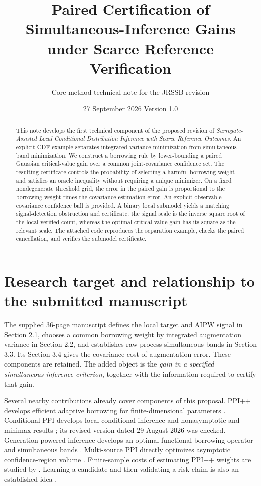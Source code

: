 \documentclass[11pt]{article}
\title{Paired Certification of Simultaneous-Inference Gains\\under Scarce Reference Verification}
\author{Core-method technical note for the JRSSB revision}
\date{27 September 2026 \quad Version 1.0}
\theoremstyle{remark}\newtheorem{remark}[theorem]{Remark}
\begin{document}
\maketitle
\begin{abstract}
This note develops the first technical component of the proposed revision of
\emph{Surrogate-Assisted Local Conditional Distribution Inference with Scarce Reference Outcomes}.
An explicit CDF example separates integrated-variance minimization from simultaneous-band minimization.
We construct a borrowing rule by lower-bounding a paired Gaussian critical-value gain over a common joint-covariance confidence set.
The resulting certificate controls the probability of selecting a harmful borrowing weight and satisfies an oracle inequality without requiring a unique minimizer.
On a fixed nondegenerate threshold grid, the error in the paired gain is proportional to the borrowing weight times the covariance-estimation error.
An explicit observable covariance confidence ball is provided.
A binary local submodel yields a matching signal-detection obstruction and certificate: the signal scale is the inverse square root of the local verified count, whereas the optimal critical-value gain has its square as the relevant scale.
The attached code reproduces the separation example, checks the paired cancellation, and verifies the submodel certificate.
\end{abstract}

\section{Research target and relationship to the submitted manuscript}
The supplied 36-page manuscript defines the local target and AIPW signal in Section 2.1, chooses a common borrowing weight by integrated augmentation variance in Section 2.2, and establishes raw-process simultaneous bands in Section 3.3. Its Section 3.4 gives the covariance cost of augmentation error. These components are retained.
The added object is the \emph{gain in a specified simultaneous-inference criterion}, together with the information required to certify that gain.

Several nearby contributions already cover components of this proposal.
PPI++ develops efficient adaptive borrowing for finite-dimensional parameters \citep{ppi}.
Conditional PPI develops local conditional inference and nonasymptotic and minimax results \citep{ppci}; its revised version dated 29 August 2026 was checked.
Generation-powered inference develops an optimal functional borrowing operator and simultaneous bands \citep{gpi}.
Multi-source PPI directly optimizes asymptotic confidence-region volume \citep{mppi}.
Finite-sample costs of estimating PPI++ weights are studied by \citet{nfl}.
Learning a candidate and then validating a risk claim is also an established idea \citep{ltt}.
\end{document}
